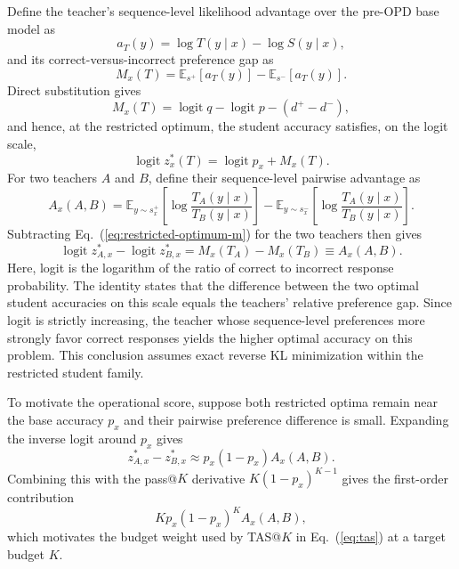 \documentclass{article}
\theoremstyle{opdplain}
\begin{document}
Define the teacher's sequence-level likelihood advantage over the pre-OPD base model as
\[
    a_T(y)=\log T(y\mid x)-\log S(y\mid x),
\]
and its correct-versus-incorrect preference gap as
\[
    M_x(T)=\mathbb E_{s^+}[a_T(y)]-\mathbb E_{s^-}[a_T(y)].
\]
Direct substitution gives
\[
    M_x(T)=\operatorname{logit}q-\operatorname{logit}p-(d^+-d^-),
\]
and hence, at the restricted optimum, the student accuracy satisfies, on the logit scale,
\begin{equation}
    \operatorname{logit}z_x^*(T)=\operatorname{logit}p_x+M_x(T).
    \label{eq:restricted-optimum-m}
\end{equation}
For two teachers $A$ and $B$, define their sequence-level pairwise advantage as
\begin{equation}
 A_x(A,B)=
 \mathbb E_{y\sim s_x^+}\!\left[\log\frac{T_A(y\mid x)}{T_B(y\mid x)}\right]
 -\mathbb E_{y\sim s_x^-}\!\left[\log\frac{T_A(y\mid x)}{T_B(y\mid x)}\right].
 \label{eq:teacher-advantage-exact}
\end{equation}
Subtracting Eq.~(\ref{eq:restricted-optimum-m}) for the two teachers then gives
\begin{equation}
    \operatorname{logit}z^*_{A,x}-\operatorname{logit}z^*_{B,x}
    =M_x(T_A)-M_x(T_B)\equiv A_x(A,B).
    \label{eq:tas-exact-ordering}
\end{equation}
Here, logit is the logarithm of the ratio of correct to incorrect response probability. The identity states that the difference between the two optimal student accuracies on this scale equals the teachers' relative preference gap. Since logit is strictly increasing, the teacher whose sequence-level preferences more strongly favor correct responses yields the higher optimal accuracy on this problem. This conclusion assumes exact reverse KL minimization within the restricted student family.

To motivate the operational score, suppose both restricted optima remain near the base accuracy $p_x$ and their pairwise preference difference is small. Expanding the inverse logit around $p_x$ gives
\[
    z^*_{A,x}-z^*_{B,x}
    \approx p_x(1-p_x)A_x(A,B).
\]
Combining this with the pass@$K$ derivative $K(1-p_x)^{K-1}$ gives the first-order contribution
\[
    Kp_x(1-p_x)^K A_x(A,B),
\]
which motivates the budget weight used by TAS@$K$ in Eq.~(\ref{eq:tas}) at a target budget $K$.
\end{document}
